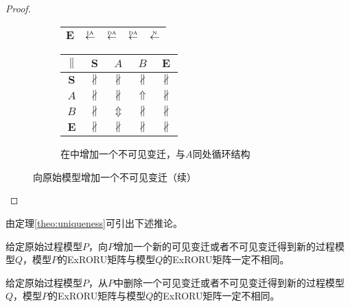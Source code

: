 \begin{proof}
\begin{figure}[htbp]
\begin{subfigure}{1\textwidth}
\begin{minipage}[b]{0.3\textwidth}
\begin{tabular}{|c|c|c|c|c|}
        $\bm{E}$ & $\overset{\text{\tiny{IA}}}{\leftarrow}$ & $\overset{\text{\tiny{DA}}}{\leftarrow}$ & $\overset{\text{\tiny{DA}}}{\leftarrow}$ & $\overset{\text{\tiny{N}}}{\leftarrow}$\\ \hline
      \end{tabular}
    \end{minipage}
    \begin{minipage}[b]{0.3\textwidth}
      \vspace{1em}
      \centering
      \begin{tabular}{|c|c|c|c|c|} \hline
        $\parallel$ & $\bm{S}$ & $A$ & $B$ & $\bm{E}$\\ \hline
        $\bm{S}$ & $\nparallel$ & $\nparallel$ & $\nparallel$ & $\nparallel$\\ \hline
        $A$ & $\nparallel$ & $\nparallel$ & $\Uparrow$ & $\nparallel$\\ \hline
        $B$ & $\nparallel$ & $\Updownarrow$ & $\nparallel$ & $\nparallel$\\ \hline
        $\bm{E}$ & $\nparallel$ & $\nparallel$ & $\nparallel$ & $\nparallel$\\ \hline
      \end{tabular}
    \end{minipage}
    \caption{在中增加一个不可见变迁，与$A$同处循环结构}
    \label{fig:uniqueness_3_i}
  \end{subfigure}


  \caption{向原始模型增加一个不可见变迁（续）}
  \label{fig:uniqueness_3}
\end{figure}
\end{proof}

由定理\ref{theo:uniqueness}可引出下述推论。

\begin{corollary}\label{cor:add_visible_transition}
给定原始过程模型$P$，向$P$增加一个新的可见变迁或者不可见变迁得到新的过程模型$Q$，模型$P$的ExRORU矩阵与模型$Q$的ExRORU矩阵一定不相同。
\end{corollary}

\begin{corollary}\label{cor:remove_visible_transition}
给定原始过程模型$P$，从$P$中删除一个可见变迁或者不可见变迁得到新的过程模型$Q$，模型$P$的ExRORU矩阵与模型$Q$的ExRORU矩阵一定不相同。
\end{corollary}

